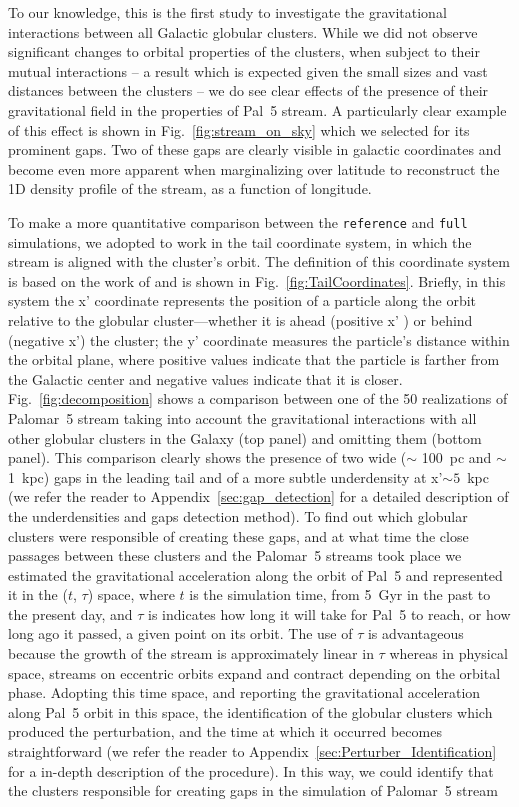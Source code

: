 \documentclass[draft]{aa}
\begin{document}
    To our knowledge, this is the first study to investigate the gravitational interactions between all Galactic globular clusters. While we did not  observe significant changes to orbital properties of the clusters, when subject to their mutual interactions -- a result which is  expected given the small sizes and vast distances between the clusters -- we do see clear effects of the presence of their gravitational field in the properties of Pal~5 stream. A particularly clear example of this effect is shown in Fig.~\ref{fig:stream_on_sky} which we selected for its prominent gaps. Two of these gaps are clearly visible in galactic coordinates and become even more apparent when marginalizing over latitude to reconstruct the 1D density profile of the stream, as a function of longitude.

    To make a more quantitative comparison between the \texttt{reference} and \texttt{full} simulations, we adopted to work in the tail coordinate system, in which  the stream is aligned with the cluster's orbit. The definition of this coordinate system is based on the work of \citet{2004AJ....127.2753D} and is shown in Fig.~\ref{fig:TailCoordinates}. Briefly, in this system the x' coordinate represents the position of a particle along the orbit relative to the globular cluster—whether it is ahead (positive x' ) or behind (negative x') the cluster;  the y' coordinate measures the particle's distance within the orbital plane, where positive values indicate that the particle is farther from the Galactic center and negative values indicate that it is closer. Fig.~\ref{fig:decomposition} shows a comparison between one of the 50 realizations of Palomar~5 stream taking into account the gravitational interactions with all other globular clusters in the Galaxy (top panel) and omitting them (bottom panel). This comparison clearly shows the presence of two wide ($\sim$ 100~pc and $\sim$ 1~kpc) gaps in the leading tail and of a more subtle underdensity at x'$\sim 5$~kpc (we refer the reader to Appendix~\ref{sec:gap_detection} for a detailed description of the underdensities and gaps detection method). To find out which globular clusters were responsible of creating these gaps, and at what time the close passages between these clusters and the Palomar~5 streams took place we estimated the gravitational acceleration along the orbit of Pal~5 and represented it in the ($t$, $\tau$) space, where $t$ is the simulation time, from 5~Gyr in the past to the present day, and $\tau$ is indicates how long it will take for Pal~5 to reach, or how  long ago it passed, a given point on its orbit. The use of $\tau$ is advantageous because the growth of the stream is approximately linear in $\tau$ whereas in physical space, streams on eccentric orbits expand and contract depending on the orbital phase. Adopting this time space, and reporting the gravitational acceleration along Pal~5 orbit in this space, the identification of the globular clusters which produced the perturbation, and the time at which it occurred becomes straightforward (we refer the reader to Appendix~\ref{sec:Perturber_Identification} for a in-depth description of the procedure). In this way, we could identify that the clusters responsible for creating gaps in the simulation of Palomar~5 stream 
\end{document}
